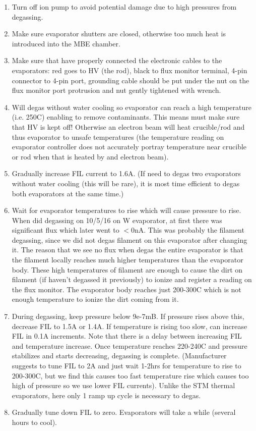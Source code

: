 \begin{enumerate}
\item	Turn off ion pump to avoid potential damage due to high pressures from degassing. 
\item	Make sure evaporator shutters are closed, otherwise too much heat is introduced into the MBE chamber.
\item	Make sure that have properly connected the electronic cables to the evaporators: red goes to HV (the rod), black to flux monitor terminal, 4-pin connector to 4-pin port, grounding cable should be put under the nut on the flux monitor port protrusion and nut gently tightened with wrench.
\item	Will degas without water cooling so evaporator can reach a high temperature (i.e. 250C) enabling to remove contaminants. This means must make sure that HV is kept off! Otherwise an electron beam will heat crucible/rod and thus evaporator to unsafe temperatures (the temperature reading on evaporator controller does not accurately portray temperature near crucible or rod when that is heated by and electron beam).
\item Gradually increase FIL current to 1.6A. (If need to degas two evaporators without water cooling (this will be rare), it is most time efficient to degas both evaporators at the same time.)
\item	Wait for evaporator temperatures to rise which will cause pressure to rise. 
When did degassing on 10/5/16 on W evaporator, at first there was significant flux which later went to $<$0nA. This was probably the filament degassing, since we did not degas filament on this evaporator after changing it. The reason that we see no flux when degas the entire evaporator is that the filament locally reaches much higher temperatures than the evaporator body. These high temperatures of filament are enough to cause the dirt on filament (if haven’t degassed it previously) to ionize and register a reading on the flux monitor. The evaporator body reaches just 200-300C which is not enough temperature to ionize the dirt coming from it.
\item	During degassing, keep pressure below 9e-7mB. If pressure rises above this, decrease FIL to 1.5A or 1.4A. If temperature is rising too slow, can increase FIL in 0.1A increments. Note that there is a delay between increasing FIL and temperature increase. Once temperature reaches 220-240C and pressure stabilizes and starts decreasing, degassing is complete. (Manufacturer suggests to tune FIL to 2A and just wait 1-2hrs for temperature to rise to 200-300C, but we find this causes too fast temperature rise which causes too high of pressure so we use lower FIL currents). Unlike the STM thermal evaporators, here only 1 ramp up cycle is necessary to degas.
\item	Gradually tune down FIL to zero. Evaporators will take a while (several hours to cool).
\end{enumerate}
